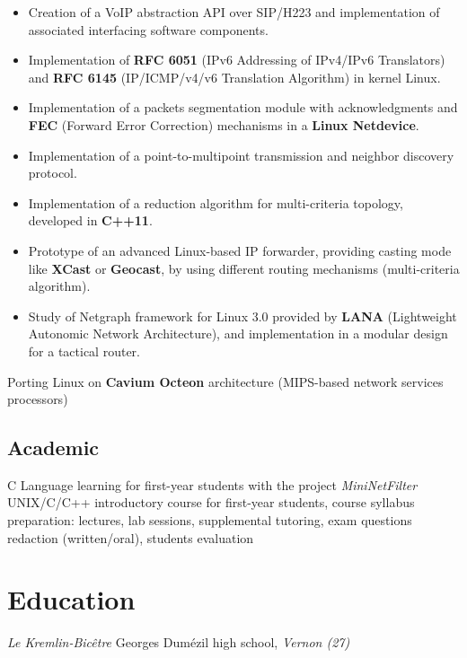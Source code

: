 \documentclass[11pt, a4paper]{moderncv}
\begin{document}
{
  \begin{itemize}
    \renewcommand{\labelitemi}{$\bullet$  }
    \item Creation of a VoIP abstraction API over SIP/H223 and implementation of associated interfacing software
      components.
    \item Implementation of \textbf{RFC 6051} (IPv6 Addressing of IPv4/IPv6 Translators) and \textbf{RFC 6145} (IP/ICMP/v4/v6
      Translation Algorithm) in kernel Linux.
    \item Implementation of a packets segmentation module with acknowledgments and \textbf{FEC} (Forward Error Correction)
      mechanisms in a \textbf{Linux Netdevice}.
    \item Implementation of a point-to-multipoint transmission and neighbor discovery protocol.
    \item Implementation of a reduction algorithm for multi-criteria topology, developed in \textbf{C++11}.
    \item Prototype of an advanced Linux-based IP forwarder, providing casting mode like \textbf{XCast} or \textbf{Geocast},
      by using different routing mechanisms (multi-criteria algorithm).
    \item Study of Netgraph framework for Linux 3.0 provided by \textbf{LANA} (Lightweight Autonomic Network Architecture),
      and implementation in a modular design for a tactical router.
  \end{itemize}
}
{
	Porting Linux on \textbf{Cavium Octeon} architecture (MIPS-based network services processors)
}

\subsection{Academic}
		{C Language learning for first-year students with the project \textit{MiniNetFilter}}
		{UNIX/C/C++ introductory course for first-year students, course syllabus preparation: lectures, lab sessions,
			supplemental tutoring, exam questions redaction (written/oral), students evaluation}

\newpage
\section{Education}
			{\textit{Le Kremlin-Bic\^etre}}{}{}
			{Georges Dumézil high school, \textit{Vernon (27)}}{}{}
\end{document}
